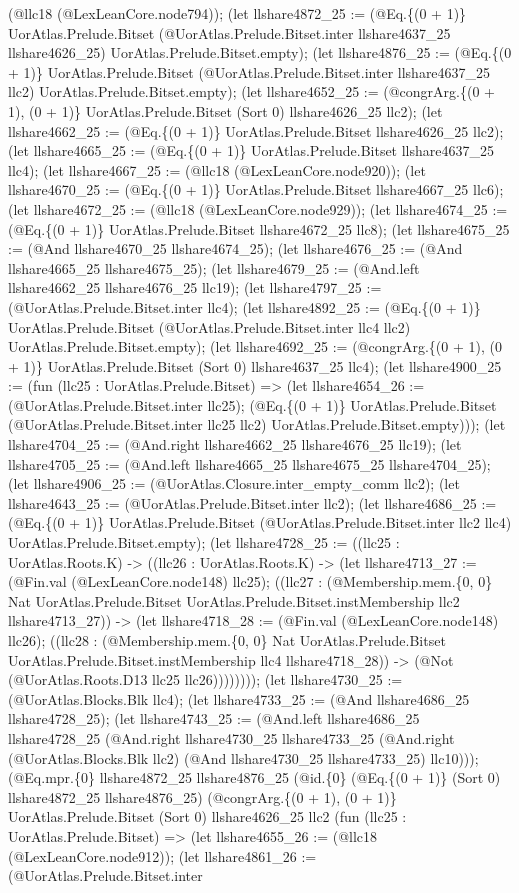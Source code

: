 \documentclass[11pt]{article}
\begin{document}
(@llc18 (@LexLeanCore.node794)); (let llshare4872\_25 := (@Eq.\{(0 + 1)\} UorAtlas.Prelude.Bitset (@UorAtlas.Prelude.Bitset.inter llshare4637\_25 llshare4626\_25) UorAtlas.Prelude.Bitset.empty); (let llshare4876\_25 := (@Eq.\{(0 + 1)\} UorAtlas.Prelude.Bitset (@UorAtlas.Prelude.Bitset.inter llshare4637\_25 llc2) UorAtlas.Prelude.Bitset.empty); (let llshare4652\_25 := (@congrArg.\{(0 + 1), (0 + 1)\} UorAtlas.Prelude.Bitset (Sort 0) llshare4626\_25 llc2); (let llshare4662\_25 := (@Eq.\{(0 + 1)\} UorAtlas.Prelude.Bitset llshare4626\_25 llc2); (let llshare4665\_25 := (@Eq.\{(0 + 1)\} UorAtlas.Prelude.Bitset llshare4637\_25 llc4); (let llshare4667\_25 := (@llc18 (@LexLeanCore.node920)); (let llshare4670\_25 := (@Eq.\{(0 + 1)\} UorAtlas.Prelude.Bitset llshare4667\_25 llc6); (let llshare4672\_25 := (@llc18 (@LexLeanCore.node929)); (let llshare4674\_25 := (@Eq.\{(0 + 1)\} UorAtlas.Prelude.Bitset llshare4672\_25 llc8); (let llshare4675\_25 := (@And llshare4670\_25 llshare4674\_25); (let llshare4676\_25 := (@And llshare4665\_25 llshare4675\_25); (let llshare4679\_25 := (@And.left llshare4662\_25 llshare4676\_25 llc19); (let llshare4797\_25 := (@UorAtlas.Prelude.Bitset.inter llc4); (let llshare4892\_25 := (@Eq.\{(0 + 1)\} UorAtlas.Prelude.Bitset (@UorAtlas.Prelude.Bitset.inter llc4 llc2) UorAtlas.Prelude.Bitset.empty); (let llshare4692\_25 := (@congrArg.\{(0 + 1), (0 + 1)\} UorAtlas.Prelude.Bitset (Sort 0) llshare4637\_25 llc4); (let llshare4900\_25 := (fun (llc25 : UorAtlas.Prelude.Bitset) => (let llshare4654\_26 := (@UorAtlas.Prelude.Bitset.inter llc25); (@Eq.\{(0 + 1)\} UorAtlas.Prelude.Bitset (@UorAtlas.Prelude.Bitset.inter llc25 llc2) UorAtlas.Prelude.Bitset.empty))); (let llshare4704\_25 := (@And.right llshare4662\_25 llshare4676\_25 llc19); (let llshare4705\_25 := (@And.left llshare4665\_25 llshare4675\_25 llshare4704\_25); (let llshare4906\_25 := (@UorAtlas.Closure.inter\_empty\_comm llc2); (let llshare4643\_25 := (@UorAtlas.Prelude.Bitset.inter llc2); (let llshare4686\_25 := (@Eq.\{(0 + 1)\} UorAtlas.Prelude.Bitset (@UorAtlas.Prelude.Bitset.inter llc2 llc4) UorAtlas.Prelude.Bitset.empty); (let llshare4728\_25 := ((llc25 : UorAtlas.Roots.K) -> ((llc26 : UorAtlas.Roots.K) -> (let llshare4713\_27 := (@Fin.val (@LexLeanCore.node148) llc25); ((llc27 : (@Membership.mem.\{0, 0\} Nat UorAtlas.Prelude.Bitset UorAtlas.Prelude.Bitset.instMembership llc2 llshare4713\_27)) -> (let llshare4718\_28 := (@Fin.val (@LexLeanCore.node148) llc26); ((llc28 : (@Membership.mem.\{0, 0\} Nat UorAtlas.Prelude.Bitset UorAtlas.Prelude.Bitset.instMembership llc4 llshare4718\_28)) -> (@Not (@UorAtlas.Roots.D13 llc25 llc26)))))))); (let llshare4730\_25 := (@UorAtlas.Blocks.Blk llc4); (let llshare4733\_25 := (@And llshare4686\_25 llshare4728\_25); (let llshare4743\_25 := (@And.left llshare4686\_25 llshare4728\_25 (@And.right llshare4730\_25 llshare4733\_25 (@And.right (@UorAtlas.Blocks.Blk llc2) (@And llshare4730\_25 llshare4733\_25) llc10))); (@Eq.mpr.\{0\} llshare4872\_25 llshare4876\_25 (@id.\{0\} (@Eq.\{(0 + 1)\} (Sort 0) llshare4872\_25 llshare4876\_25) (@congrArg.\{(0 + 1), (0 + 1)\} UorAtlas.Prelude.Bitset (Sort 0) llshare4626\_25 llc2 (fun (llc25 : UorAtlas.Prelude.Bitset) => (let llshare4655\_26 := (@llc18 (@LexLeanCore.node912)); (let llshare4861\_26 := (@UorAtlas.Prelude.Bitset.inter 
\end{document}
